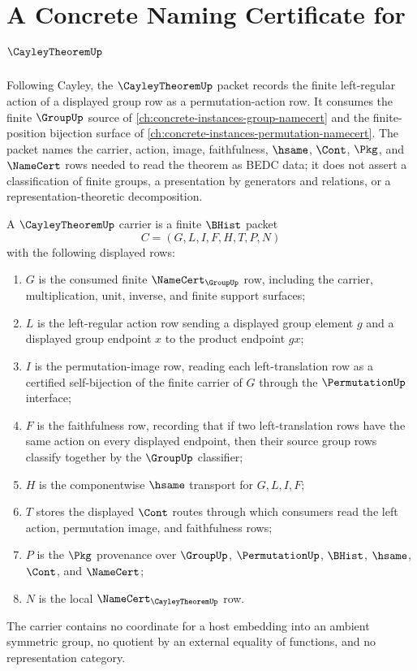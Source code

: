\chapter{A Concrete Naming Certificate for $\CayleyTheoremUp$}
\label{ch:concrete-instances-cayley-theorem-namecert}

Following Cayley, the $\CayleyTheoremUp$ packet records the finite left-regular
action of a displayed group row as a permutation-action row. It consumes the
finite $\GroupUp$ source of \autoref{ch:concrete-instances-group-namecert} and
the finite-position bijection surface of
\autoref{ch:concrete-instances-permutation-namecert}. The packet names the
carrier, action, image, faithfulness, $\hsame$, $\Cont$, $\Pkg$, and
$\NameCert$ rows needed to read the theorem as BEDC data; it does not assert a
classification of finite groups, a presentation by generators and relations,
or a representation-theoretic decomposition.

\begin{definition}
\label{def:cayley-theorem-carrier}
A $\CayleyTheoremUp$ carrier is a finite $\BHist$ packet
$$
C=(G,L,I,F,H,T,P,N)
$$
with the following displayed rows:
\begin{enumerate}
\item $G$ is the consumed finite $\NameCert_{\GroupUp}$ row, including the
carrier, multiplication, unit, inverse, and finite support surfaces;
\item $L$ is the left-regular action row sending a displayed group element $g$
and a displayed group endpoint $x$ to the product endpoint $gx$;
\item $I$ is the permutation-image row, reading each left-translation row as a
certified self-bijection of the finite carrier of $G$ through the
$\PermutationUp$ interface;
\item $F$ is the faithfulness row, recording that if two left-translation
rows have the same action on every displayed endpoint, then their source group
rows classify together by the $\GroupUp$ classifier;
\item $H$ is the componentwise $\hsame$ transport for $G,L,I,F$;
\item $T$ stores the displayed $\Cont$ routes through which consumers read the
left action, permutation image, and faithfulness rows;
\item $P$ is the $\Pkg$ provenance over $\GroupUp$, $\PermutationUp$, $\BHist$,
$\hsame$, $\Cont$, and $\NameCert$;
\item $N$ is the local $\NameCert_{\CayleyTheoremUp}$ row.
\end{enumerate}
The carrier contains no coordinate for a host embedding into an ambient
symmetric group, no quotient by an external equality of functions, and no
representation category.
\end{definition}

